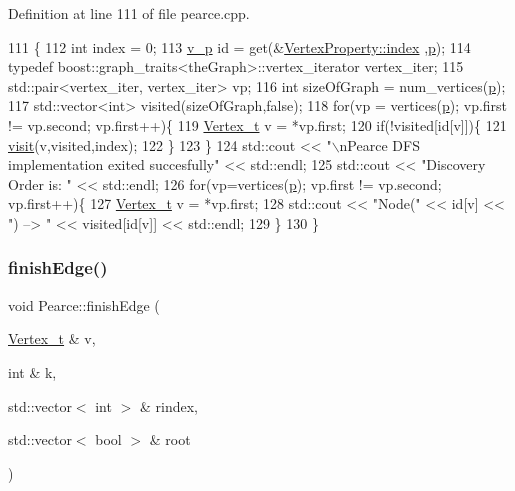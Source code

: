 Definition at line 111 of file pearce.\+cpp.


\begin{DoxyCode}
111                  \{
112     \textcolor{keywordtype}{int} index = 0;
113     \hyperlink{utilities_8h_a3f4959b3d837fa6351a9414c79280286}{v\_p} \textcolor{keywordtype}{id} = \textcolor{keyword}{get}(&\hyperlink{struct_utility_structs_1_1_vertex_property_a636cb729438e999aa3d9a17ac39d8641}{VertexProperty::index} ,\hyperlink{class_pearce_a2320928312fd97f6bcb1f16684f79a03}{p});
114     \textcolor{keyword}{typedef} boost::graph\_traits<theGraph>::vertex\_iterator vertex\_iter;
115     std::pair<vertex\_iter, vertex\_iter> vp;
116     \textcolor{keywordtype}{int} sizeOfGraph = num\_vertices(\hyperlink{class_pearce_a2320928312fd97f6bcb1f16684f79a03}{p});
117     std::vector<int> visited(sizeOfGraph,\textcolor{keyword}{false});
118     \textcolor{keywordflow}{for}(vp = vertices(\hyperlink{class_pearce_a2320928312fd97f6bcb1f16684f79a03}{p}); vp.first != vp.second; vp.first++)\{
119         \hyperlink{utilities_8h_a344cd987714d06997f0becda3c96d6e2}{Vertex\_t} v = *vp.first;
120         \textcolor{keywordflow}{if}(!visited[\textcolor{keywordtype}{id}[v]])\{
121             \hyperlink{class_pearce_ac5e668d0d21ee0dad33cea171b9e2022}{visit}(v,visited,index);
122         \}
123     \}
124     std::cout << \textcolor{stringliteral}{"\(\backslash\)nPearce DFS implementation exited succesfully"} << std::endl;
125     std::cout << \textcolor{stringliteral}{"Discovery Order is: "} << std::endl;
126     \textcolor{keywordflow}{for}(vp=vertices(\hyperlink{class_pearce_a2320928312fd97f6bcb1f16684f79a03}{p}); vp.first != vp.second; vp.first++)\{
127         \hyperlink{utilities_8h_a344cd987714d06997f0becda3c96d6e2}{Vertex\_t} v = *vp.first;
128         std::cout << \textcolor{stringliteral}{"Node("} << \textcolor{keywordtype}{id}[v] << \textcolor{stringliteral}{") --> "} << visited[\textcolor{keywordtype}{id}[v]] << std::endl;
129     \}
130 \}
\end{DoxyCode}
\mbox{\label{class_pearce_a4ed2b91ac3246895ec5d70fe3530690e}} 
\subsubsection{\texorpdfstring{finish\+Edge()}{finishEdge()}}
{\footnotesize\ttfamily void Pearce\+::finish\+Edge (\begin{DoxyParamCaption}\item[{\hyperlink{class_graph_component_ae67114a6ce5a001dc35e1996e1b45aa0}{Vertex\+\_\+t} \&}]{v,  }\item[{int \&}]{k,  }\item[{std\+::vector$<$ int $>$ \&}]{rindex,  }\item[{std\+::vector$<$ bool $>$ \&}]{root }\end{DoxyParamCaption})}



